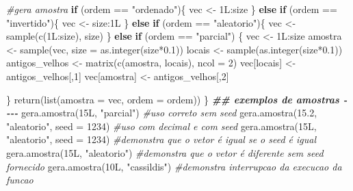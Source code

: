\documentclass[
]{article}
\newenvironment{Shaded}{\begin{snugshade}}{\end{snugshade}}
\newcommand{\AttributeTok}[1]{\textcolor[rgb]{0.77,0.63,0.00}{#1}}
\newcommand{\CommentTok}[1]{\textcolor[rgb]{0.56,0.35,0.01}{\textit{#1}}}
\newcommand{\ControlFlowTok}[1]{\textcolor[rgb]{0.13,0.29,0.53}{\textbf{#1}}}
\newcommand{\DecValTok}[1]{\textcolor[rgb]{0.00,0.00,0.81}{#1}}
\newcommand{\DocumentationTok}[1]{\textcolor[rgb]{0.56,0.35,0.01}{\textbf{\textit{#1}}}}
\newcommand{\FloatTok}[1]{\textcolor[rgb]{0.00,0.00,0.81}{#1}}
\newcommand{\FunctionTok}[1]{\textcolor[rgb]{0.00,0.00,0.00}{#1}}
\newcommand{\NormalTok}[1]{#1}
\newcommand{\OtherTok}[1]{\textcolor[rgb]{0.56,0.35,0.01}{#1}}
\newcommand{\SpecialCharTok}[1]{\textcolor[rgb]{0.00,0.00,0.00}{#1}}
\newcommand{\StringTok}[1]{\textcolor[rgb]{0.31,0.60,0.02}{#1}}
\begin{document}
\begin{Shaded}
\begin{Highlighting}[]
  \CommentTok{\#gera amostra}
  \ControlFlowTok{if}\NormalTok{ (ordem }\SpecialCharTok{==} \StringTok{"ordenado"}\NormalTok{)\{}
\NormalTok{    vec }\OtherTok{\textless{}{-}}\NormalTok{ 1L}\SpecialCharTok{:}\NormalTok{size}
\NormalTok{\} }\ControlFlowTok{else} \ControlFlowTok{if}\NormalTok{ (ordem }\SpecialCharTok{==} \StringTok{"invertido"}\NormalTok{)\{}
\NormalTok{    vec }\OtherTok{\textless{}{-}}\NormalTok{ size}\SpecialCharTok{:}\NormalTok{1L}
\NormalTok{\} }\ControlFlowTok{else} \ControlFlowTok{if}\NormalTok{ (ordem }\SpecialCharTok{==} \StringTok{"aleatorio"}\NormalTok{)\{}
\NormalTok{    vec }\OtherTok{\textless{}{-}} \FunctionTok{sample}\NormalTok{(}\FunctionTok{c}\NormalTok{(1L}\SpecialCharTok{:}\NormalTok{size), size)}
\NormalTok{\} }\ControlFlowTok{else} \ControlFlowTok{if}\NormalTok{ (ordem }\SpecialCharTok{==} \StringTok{"parcial"}\NormalTok{) \{}
\NormalTok{  vec }\OtherTok{\textless{}{-}}\NormalTok{ 1L}\SpecialCharTok{:}\NormalTok{size}
\NormalTok{  amostra }\OtherTok{\textless{}{-}} \FunctionTok{sample}\NormalTok{(vec, }\AttributeTok{size =} \FunctionTok{as.integer}\NormalTok{(size}\SpecialCharTok{*}\FloatTok{0.1}\NormalTok{))}
\NormalTok{  locais }\OtherTok{\textless{}{-}} \FunctionTok{sample}\NormalTok{(}\FunctionTok{as.integer}\NormalTok{(size}\SpecialCharTok{*}\FloatTok{0.1}\NormalTok{)) }
\NormalTok{  antigos\_velhos }\OtherTok{\textless{}{-}} \FunctionTok{matrix}\NormalTok{(}\FunctionTok{c}\NormalTok{(amostra, locais), }\AttributeTok{ncol =} \DecValTok{2}\NormalTok{)}
\NormalTok{  vec[locais] }\OtherTok{\textless{}{-}}\NormalTok{ antigos\_velhos[,}\DecValTok{1}\NormalTok{]}
\NormalTok{  vec[amostra] }\OtherTok{\textless{}{-}}\NormalTok{ antigos\_velhos[,}\DecValTok{2}\NormalTok{]}
    
\NormalTok{  \}}
  \FunctionTok{return}\NormalTok{(}\FunctionTok{list}\NormalTok{(}\AttributeTok{amostra =}\NormalTok{ vec, }\AttributeTok{ordem =}\NormalTok{ ordem))}
\NormalTok{\}}
\DocumentationTok{\#\# exemplos de amostras {-}{-}{-}{-}}
\FunctionTok{gera.amostra}\NormalTok{(15L, }\StringTok{"parcial"}\NormalTok{) }\CommentTok{\#uso correto sem seed}
\FunctionTok{gera.amostra}\NormalTok{(}\FloatTok{15.2}\NormalTok{, }\StringTok{"aleatorio"}\NormalTok{, }\AttributeTok{seed =} \DecValTok{1234}\NormalTok{) }\CommentTok{\#uso com decimal e com seed}
\FunctionTok{gera.amostra}\NormalTok{(15L, }\StringTok{"aleatorio"}\NormalTok{, }\AttributeTok{seed =} \DecValTok{1234}\NormalTok{) }\CommentTok{\#demonstra que o vetor é igual se o seed é igual}
\FunctionTok{gera.amostra}\NormalTok{(15L, }\StringTok{"aleatorio"}\NormalTok{) }\CommentTok{\#demonstra que o vetor é diferente sem seed fornecido}
\FunctionTok{gera.amostra}\NormalTok{(10L, }\StringTok{"cassildis"}\NormalTok{) }\CommentTok{\#demonstra interrupcao da execucao da funcao}


\end{Highlighting}
\end{Shaded}
\end{document}
